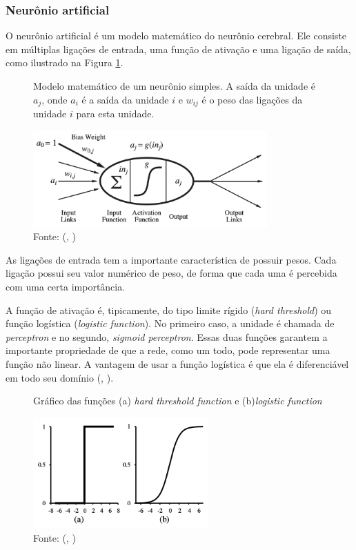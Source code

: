\documentclass[]{politex}
\begin{document}
\subsubsection{Neurônio artificial}
O neurônio artificial é um modelo matemático do neurônio cerebral. Ele consiste em múltiplas ligações de entrada, uma função de ativação e uma ligação de saída, como ilustrado na Figura \ref{fig:neuronio}.

\begin{figure}[H]
    \centering
    \caption{Modelo matemático de um neurônio simples. A saída da unidade é \(a_j\), onde \(a_i\) é a saída da unidade \(i\) e \(w_{ij}\) é o peso das ligações da unidade \(i\) para esta unidade.}
    \includegraphics[width=0.8\textwidth]{Neuronio}
    \caption*{Fonte: (, \citeyear{Russell})}
    \label{fig:neuronio}
\end{figure}

As ligações de entrada tem a importante característica de possuir pesos. Cada ligação possui seu valor numérico de peso, de forma que cada uma é percebida com uma certa importância.

A função de ativação é, tipicamente, do tipo limite rígido (\textit{hard threshold}) ou função logística (\textit{logistic function}). No primeiro caso, a unidade é chamada de \textit{perceptron} e no segundo, \textit{sigmoid perceptron}. Essas duas funções garantem a importante propriedade de que a rede, como um todo, pode representar uma função não linear. A vantagem de usar a função logística é que ela é diferenciável em todo seu domínio (, \citeyear{Russell}).

\begin{figure}[H]
    \centering
    \caption{Gráfico das funções (a) \textit{hard threshold function} e (b)\textit{logistic function}}
    \includegraphics[width=0.6\textwidth]{funcativacao}
    \caption*{Fonte: (, \citeyear{Russell})}
    \label{fig:funcativacao}
\end{figure}
\end{document}
